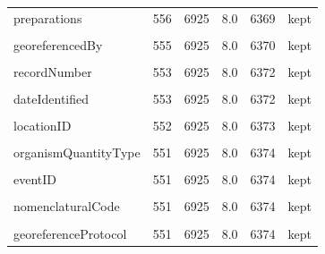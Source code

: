 \documentclass[sn-apa,pdflatex]{sn-jnl}
\begin{document}
\begin{longtable}[t]{lrrrrl}
preparations & 556 & 6925 & 8.0 & 6369 & kept\\
\addlinespace
\cellcolor{gray!10}{identifiedBy} & \cellcolor{gray!10}{555} & \cellcolor{gray!10}{6925} & \cellcolor{gray!10}{8.0} & \cellcolor{gray!10}{6370} & \cellcolor{gray!10}{kept}\\
georeferencedBy & 555 & 6925 & 8.0 & 6370 & kept\\
\cellcolor{gray!10}{georeferenceRemarks} & \cellcolor{gray!10}{555} & \cellcolor{gray!10}{6925} & \cellcolor{gray!10}{8.0} & \cellcolor{gray!10}{6370} & \cellcolor{gray!10}{kept}\\
recordNumber & 553 & 6925 & 8.0 & 6372 & kept\\
\cellcolor{gray!10}{higherClassification} & \cellcolor{gray!10}{553} & \cellcolor{gray!10}{6925} & \cellcolor{gray!10}{8.0} & \cellcolor{gray!10}{6372} & \cellcolor{gray!10}{kept}\\
\addlinespace
dateIdentified & 553 & 6925 & 8.0 & 6372 & kept\\
\cellcolor{gray!10}{ownerInstitutionCode} & \cellcolor{gray!10}{552} & \cellcolor{gray!10}{6925} & \cellcolor{gray!10}{8.0} & \cellcolor{gray!10}{6373} & \cellcolor{gray!10}{kept}\\
locationID & 552 & 6925 & 8.0 & 6373 & kept\\
\cellcolor{gray!10}{occurrenceStatus} & \cellcolor{gray!10}{551} & \cellcolor{gray!10}{6925} & \cellcolor{gray!10}{8.0} & \cellcolor{gray!10}{6374} & \cellcolor{gray!10}{kept}\\
organismQuantityType & 551 & 6925 & 8.0 & 6374 & kept\\
\addlinespace
\cellcolor{gray!10}{verbatimLocality} & \cellcolor{gray!10}{551} & \cellcolor{gray!10}{6925} & \cellcolor{gray!10}{8.0} & \cellcolor{gray!10}{6374} & \cellcolor{gray!10}{kept}\\
eventID & 551 & 6925 & 8.0 & 6374 & kept\\
\cellcolor{gray!10}{georeferenceVerificationStatus} & \cellcolor{gray!10}{551} & \cellcolor{gray!10}{6925} & \cellcolor{gray!10}{8.0} & \cellcolor{gray!10}{6374} & \cellcolor{gray!10}{kept}\\
nomenclaturalCode & 551 & 6925 & 8.0 & 6374 & kept\\
\cellcolor{gray!10}{georeferencedDate} & \cellcolor{gray!10}{551} & \cellcolor{gray!10}{6925} & \cellcolor{gray!10}{8.0} & \cellcolor{gray!10}{6374} & \cellcolor{gray!10}{kept}\\
\addlinespace
georeferenceProtocol & 551 & 6925 & 8.0 & 6374 & kept\\

\end{longtable}
\end{document}

